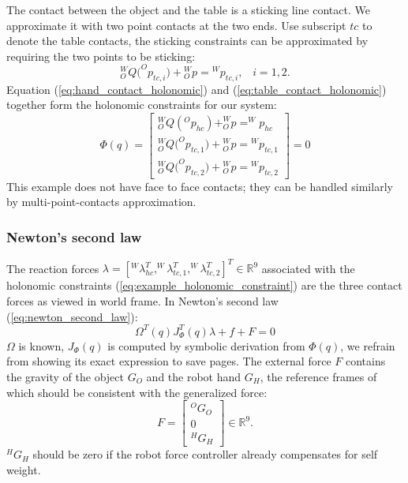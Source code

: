 The contact between the object and the table is a sticking line contact. We approximate it with two point contacts at the two ends. Use subscript $tc$ to denote the table contacts, the sticking constraints can be approximated by requiring the two points to be sticking:
\begin{equation}
\label{eq:table_contact_holonomic}
{{^W_OQ}{(^O}{p_{tc,i}}) + {^W_Op}} { = }{^Wp_{tc,i}},\;\;\; i=1,2.
\end{equation}
Equation (\ref{eq:hand_contact_holonomic}) and (\ref{eq:table_contact_holonomic}) together form the holonomic constraints for our system:
\begin{equation}
\label{eq:example_holonomic_constraint}
\Phi ({{q}}) = \left[ {\begin{array}{*{20}{c}}
{^W_OQ(^Op_{hc}) + ^W_Op = ^Wp_{hc}}\\
{{^W_OQ}{(^O}{p_{tc,1}}) + {^W_Op}} { = }{^Wp_{tc,1}}\\
{{^W_OQ}{(^O}{p_{tc,2}}) + {^W_Op}} { = }{^Wp_{tc,2}}\end{array}} \right] = 0
\end{equation}
%
This example does not have face to face contacts; they can be handled similarly by multi-point-contacts approximation.

\subsubsection{Newton's second law} %
\label{subsub:example_newton_s_second_law}
The reaction forces $\lambda=[^W\lambda_{hc}^T,^W\lambda_{tc,1}^T,^W\lambda_{tc,2}^T]^T\in \mathbb{R}^9$ associated with the holonomic constraints (\ref{eq:example_holonomic_constraint}) are the three contact forces as viewed in world frame. In Newton's second law (\ref{eq:newton_second_law}):
	 $$\Omega^T(q)J^T_\Phi(q)\lambda + f + F = 0$$
$\Omega$ is known, $J_\Phi(q)$ is computed by symbolic derivation from $\Phi(q)$, we refrain from showing its exact expression to save pages. The external force $F$ contains the gravity of the object $G_O$ and the robot hand $G_H$, the reference frames of which should be consistent with the generalized force:
\begin{equation}
F = \left[ {\begin{array}{*{20}{c}}{^O{G_O}}\\
0\\{^H{G_H}}\end{array}} \right] \in\mathbb{R}^9.
\end{equation}
$^HG_H$ should be zero if the robot force controller already compensates for self weight.


